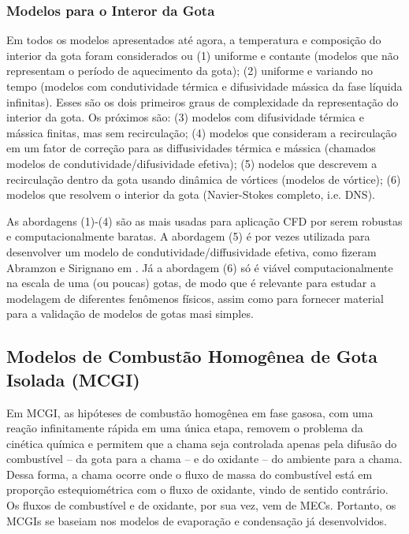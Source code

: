 \subsubsection{Modelos para o Interor da Gota} \label{sec:int}

Em todos os modelos apresentados até agora, a temperatura e composição do interior da gota foram considerados ou (1) uniforme e contante (modelos que não representam o período de aquecimento da gota); (2) uniforme e variando no tempo (modelos com condutividade térmica e difusividade mássica da fase líquida infinitas).
Esses são os dois primeiros graus de complexidade da representação do interior da gota.
Os próximos são: (3) modelos com difusividade térmica e mássica finitas, mas sem recirculação; (4) modelos que consideram a recirculação em um fator de correção para as diffusividades térmica e mássica (chamados modelos de condutividade/difusividade efetiva); (5) nodelos que descrevem a recirculação dentro da gota usando dinâmica de vórtices (modelos de vórtice); (6) modelos que resolvem o interior da gota (Navier-Stokes completo, i.e. DNS). \cite{Sazhin2006}

As abordagens (1)-(4) são as mais usadas para aplicação CFD por serem robustas e computacionalmente baratas. 
A abordagem (5) é por vezes  utilizada para desenvolver um modelo de condutividade/diffusividade efetiva, como fizeram Abramzon e Sirignano em \cite{Sirignano1989}.
Já a abordagem (6) só é viável computacionalmente na escala de uma (ou poucas) gotas, de modo que é relevante para estudar a modelagem de diferentes fenômenos físicos, assim como para fornecer material para a validação de modelos de gotas masi simples.




\subsection{Modelos de Combustão Homogênea de Gota Isolada (MCGI)} \label{sec:MCGI}

Em MCGI, as hipóteses de combustão homogênea em fase gasosa, com uma reação infinitamente rápida em uma única etapa, removem o problema da cinética química e permitem que a chama seja controlada apenas pela difusão do combustível -- da gota para a chama -- e do oxidante -- do ambiente para a chama.
Dessa forma, a chama ocorre onde o fluxo de massa do combustível está em proporção estequiométrica com o fluxo de oxidante, vindo de sentido contrário. 
Os fluxos de combustível e de oxidante, por sua vez, vem de MECs.
Portanto, os MCGIs se baseiam nos modelos de evaporação e condensação já desenvolvidos.

